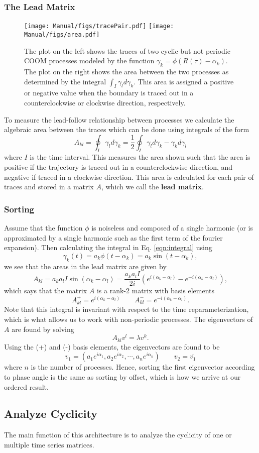 \documentclass[11pt]{article}
\begin{document}
\subsubsection{The Lead Matrix}
\begin{wrapfigure}{r}{.5\linewidth}
\texttt{[image: Manual/figs/tracePair.pdf]}
\texttt{[image: Manual/figs/area.pdf]}
\caption{\small The plot on the left shows the traces of two cyclic but not periodic COOM processes modeled by the function $\gamma_k=\phi(R(\tau)-\alpha_k)$. The plot on the right shows the area between the two processes as determined by the integral $\int_I\gamma_ld\gamma_k$. This area is assigned a positive or negative value when the boundary is traced out in a counterclockwise or clockwise direction, respectively.}
\end{wrapfigure}
To measure the lead-follow relationship between processes we calculate the algebraic area between the traces which can be done using integrals of the form 
\begin{equation}
\label{eqn:integral}
A_{kl} = \oint_I\gamma_ld\gamma_k=\frac{1}{2}\oint_I\gamma_ld\gamma_k - \gamma_kd\gamma_l
\end{equation}
where $I$ is the time interval. This measures the area shown such that the area is positive if the trajectory is traced out in a counterclockwise direction, and negative if traced in a clockwise direction. This area is calculated for each pair of traces and stored in a matrix $A$, which we call the \textbf{lead matrix}.

\subsubsection{Sorting}
Assume that the function $\phi$ is noiseless and composed of a single harmonic (or is approximated by a single harmonic such as the first term of the fourier expansion). Then calculating the integral in Eq. \ref{eqn:integral} using 
$$\gamma_k(t) = a_k\phi(t - \alpha_k) = a_k\sin(t - \alpha_k),$$ 
we see that the areas in the lead matrix are given by 
$$A_{kl} = a_ka_lI\sin(\alpha_k - \alpha_l) = \frac{a_ka_lI}{2i}\left(e^{i(\alpha_k-\alpha_l)} - e^{-i(\alpha_k-\alpha_l)}\right),$$
which says that the matrix $A$ is a rank-2 matrix with basis elements
$$A_{kl}^+ = e^{i(\alpha_k - \alpha_l)} \qquad A_{kl}^- = e^{-i(\alpha_k-\alpha_l)}.$$
Note that this integral is invariant with respect to the time reparameterization, which is what allows us to work with non-periodic processes. The eigenvectors of $A$ are found by solving 
$$A_{kl}v^l = \lambda v^k.$$
Using the (+) and (-) basis elements, the eigenvectors are found to be
$$v_1 = \left(a_1e^{i\alpha_1},a_2e^{i\alpha_2},\cdots,a_ne^{i\alpha_n}\right) \qquad v_2 = \overline{v_1}$$
where $n$ is the number of processes. Hence, sorting the first eigenvector according to phase angle is the same as sorting by offset, which is how we arrive at our ordered result.

\subsection{Analyze Cyclicity}
The main function of this architecture is to analyze the cyclicity of one or multiple time series matrices. 
\end{document}
